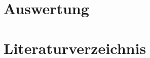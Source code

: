 \documentclass[ngerman,BCOR=4mm]{tudscrreprt}
\theoremstyle{plain} %
\theoremstyle{definition} %
\theoremstyle{remark}
\begin{document}
\chapter{Auswertung}
\label{sec: Auswertung}

\chapter{Literaturverzeichnis}


      \printbibliography
\end{document}
